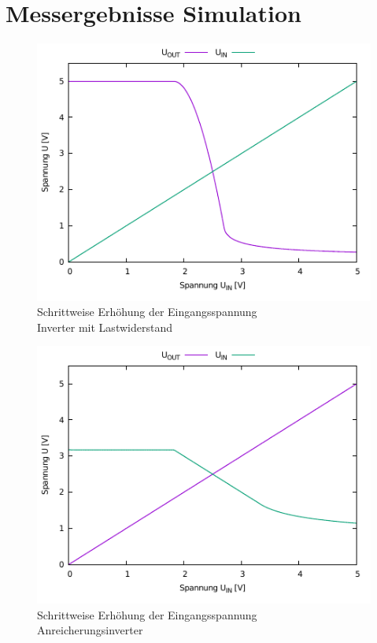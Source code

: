 \documentclass[11pt, a4paper]{article}
\begin{document}
\section*{Messergebnisse Simulation}
\begin{figure}
    \centering
    \includegraphics[width=\linewidth]{simLast.pdf}
    \caption{Schrittweise Erhöhung der Eingangsspannung \\ Inverter mit Lastwiderstand}
    \label{simLast}
\end{figure}
\begin{figure}
    \centering
    \includegraphics[width=\linewidth]{simAnreicherung.pdf}
    \caption{Schrittweise Erhöhung der Eingangsspannung \\ Anreicherungsinverter}
    \label{simAnreicherung}
\end{figure}
\end{document}
